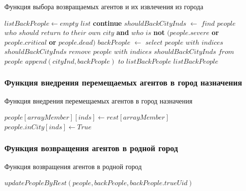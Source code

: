 \documentclass[a4paper,12pt]{article} %
\begin{document}
\begin{algorithm}[H]
\caption{Функция выбора возвращаемых агентов и их извлечения из города}
\label{alg:extractback}
\begin{algorithmic}[1]
	\State \(listBackPeople \gets empty \) \(list\)
			\State \textbf{continue}
		\EndIf
		\State \(shouldBackCityInds\) \(\gets\) \(find\) \(people\) \(who\) \(should\) \(return\) \(to\) \(their\) \(own\) \(city\) \textbf{and} \(who\) \(is\) \textbf{not} \( (people.severe \) \textbf{or} \( people.critical \) \textbf{or} \( people.dead) \)
		\State \(backPeople\) \(\gets\) \(select\) \(people\) \(with\) \(indices\) \(shouldBackCityInds\)
		\State \(remove\) \(people\) \(with\) \(indices\) \(shouldBackCityInds\) \(from\) \(people\)
		\State \(append(cityInd, backPeople)\) \(to\) \(listBackPeople\)
	\EndFor
	\State \Return \(listBackPeople\)
\EndFunction 
\end{algorithmic}
\end{algorithm}


\subsubsection{Функция внедрения перемещаемых агентов в город назначения}



\begin{algorithm}[H]
\caption{Функция внедрения перемещаемых агентов в город назначения}
\label{alg:updatepeoplebyrest}
\begin{algorithmic}[1]
			\State \(people[arrayMember][inds] \gets rest[arrayMember]\)
		\EndIf
	\EndFor
	\State \(people.inCity[inds] \gets True\)
\EndFunction
\end{algorithmic}
\end{algorithm}

\subsubsection{Функция возвращения агентов в родной город}

\begin{algorithm}[H]
\caption{Функция возвращения агентов в родной город}
\label{alg:addbackpeople}
\begin{algorithmic}[1]
	\State \(updatePeopleByRest(people,backPeople,backPeople.trueUid)\)
\EndFunction
\end{algorithmic}
\end{algorithm}
\end{document}

